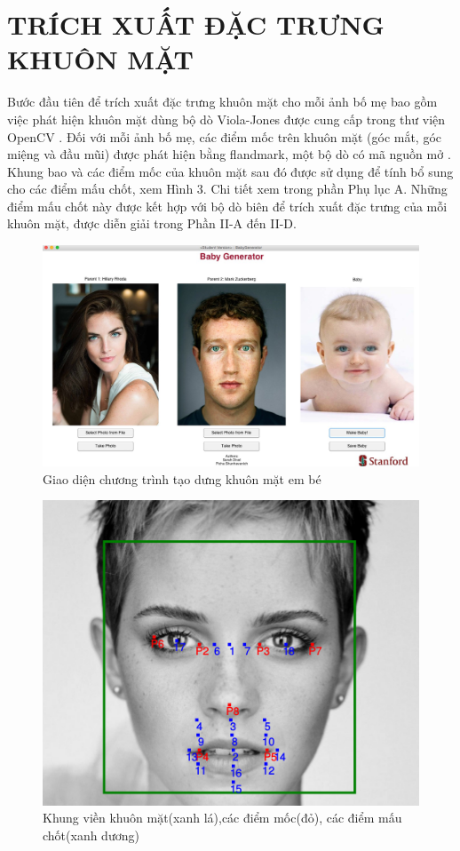 \documentclass[journal]{IEEEtran}
\begin{document}
\section{TRÍCH XUẤT ĐẶC TRƯNG KHUÔN MẶT}
Bước đầu tiên để trích xuất đặc trưng khuôn mặt cho mỗi ảnh bố mẹ bao gồm việc phát hiện khuôn mặt dùng bộ dò Viola-Jones được cung cấp trong thư viện OpenCV \cite{ref:r2}. Đối với mỗi ảnh bố mẹ, các điểm mốc trên khuôn mặt (góc mắt, góc miệng và đầu mũi) được phát hiện bằng flandmark, một bộ dò có mã nguồn mở \cite{ref:r3}. Khung bao và các điểm mốc của khuôn mặt sau đó được sử dụng để tính bổ sung cho các điểm mấu chốt, xem Hình 3. Chi tiết xem trong phần Phụ lục A. Những điểm mấu chốt này được kết hợp với bộ dò biên để trích xuất đặc trưng của mỗi khuôn mặt, được diễn giải trong Phần II-A đến II-D.
\begin{center}
    \begin{figure}[!t]
    \begin{center}
     \includegraphics[scale=1]{Images/11}
    \end{center}
    \caption{Giao diện chương trình tạo dưng khuôn mặt em bé}
    \label{refhinh2}
    \end{figure}
    \begin{figure}[!t]
    \begin{center}
     \includegraphics[scale=0.4]{Images/64}
    \end{center}
    \caption{Khung viền khuôn mặt(xanh lá),các điểm mốc(đỏ), các điểm mấu chốt(xanh dương)}
    \label{refhinh3}
    \end{figure}
\end{center}
\end{document}
